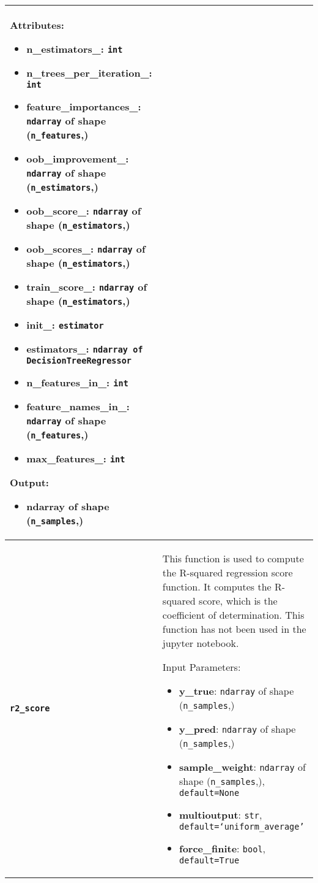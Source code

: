 \begin{longtable}{|l|p{12cm}|}
	Attributes:
	\begin{itemize}
		\item \textbf{n\_estimators\_}: \texttt{int}
		\item \textbf{n\_trees\_per\_iteration\_}: \texttt{int}
		\item \textbf{feature\_importances\_}: \texttt{ndarray} of shape (\texttt{n\_features},)
		\item \textbf{oob\_improvement\_}: \texttt{ndarray} of shape (\texttt{n\_estimators},)
		\item \textbf{oob\_score\_}: \texttt{ndarray} of shape (\texttt{n\_estimators},)
		\item \textbf{oob\_scores\_}: \texttt{ndarray} of shape (\texttt{n\_estimators},)
		\item \textbf{train\_score\_}: \texttt{ndarray} of shape (\texttt{n\_estimators},)
		\item \textbf{init\_}: \texttt{estimator}
		\item \textbf{estimators\_}: \texttt{ndarray of DecisionTreeRegressor}
		\item \textbf{n\_features\_in\_}: \texttt{int}
		\item \textbf{feature\_names\_in\_}: \texttt{ndarray} of shape (\texttt{n\_features},)
		\item \textbf{max\_features\_}: \texttt{int}
	\end{itemize}

	Output:
	\begin{itemize}
		\item \textbf{ndarray} of shape (\texttt{n\_samples},)
	\end{itemize} \\*
	\hline
	\textbf{\texttt{r2\_score}} &
	This function is used to compute the R-squared regression score function. It computes the R-squared score, which is the coefficient of determination. This function has not been used in the jupyter notebook.
	
	Input Parameters:
	\begin{itemize}
		\item \textbf{y\_true}: \texttt{ndarray} of shape (\texttt{n\_samples},)
		\item \textbf{y\_pred}: \texttt{ndarray} of shape (\texttt{n\_samples},)
		\item \textbf{sample\_weight}: \texttt{ndarray} of shape (\texttt{n\_samples},), \texttt{default=None}
		\item \textbf{multioutput}: \texttt{str}, \texttt{default=`uniform\_average'}
		\item \textbf{force\_finite}: \texttt{bool}, \texttt{default=True}
	\end{itemize}


\end{longtable}
